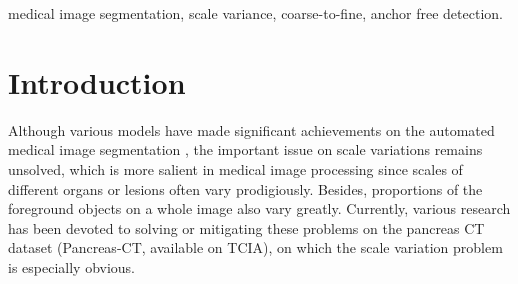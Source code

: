 \documentclass{article}
\begin{document}
\begin{abstract}

\end{abstract}
%
\begin{keywords}
medical image segmentation, scale variance, coarse-to-fine, anchor free detection.
\end{keywords}
%

%
%

\vspace{-12pt}
\section{Introduction}
\label{sec:introduction}
\vspace{-10pt}

Although various models have made significant achievements on the automated medical image segmentation \cite{unet,FCN,segnet,psp}, the important issue on scale variations remains unsolved, which is more salient in medical image processing since scales of different organs or lesions often vary prodigiously. Besides, proportions of the foreground objects on a whole image also vary greatly.
Currently, various research has been devoted to solving or mitigating these problems on the pancreas CT dataset (Pancreas-CT, available on TCIA\cite{TCIA}), on which the scale variation problem is especially obvious. \par
\end{document}
